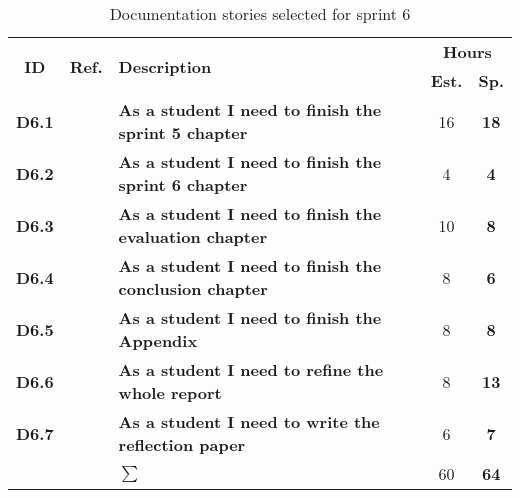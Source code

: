 \begin{table*}[!ht]%
 \def\arraystretch{1.25}
 
 \caption{Documentation stories selected for sprint 6}
   \label{tab:sprint6Documentationstories}

\begin{tabularx}{\textwidth}{ccXcc} 

\toprule[0.5mm]
\multirow{2}{*}{\textbf{ID}} &
\multirow{2}{*}{\textbf{Ref.}} & \multirow{2}{*}{\textbf{Description}} & \multicolumn{2}{c}{\textbf{Hours}} \\
 					& & & \textbf{Est.} & \textbf{Sp.} \\
\midrule

\textbf{D6.1} 	& & {\bf As a student I need to finish the sprint 5 chapter} 		& 16  & \textbf{18} \\
	
\textbf{D6.2} 	& & {\bf As a student I need to finish the sprint 6 chapter} 		& 4	& \textbf{4} \\

\textbf{D6.3} 	& & {\bf As a student I need to finish the evaluation chapter} 		& 10	& \textbf{8} \\

\textbf{D6.4} 	&& {\bf As a student I need to finish the conclusion chapter} 		& 8	& \textbf{6} \\

\textbf{D6.5} 	&& {\bf As a student I need to finish the Appendix} 				& 8	& \textbf{8} \\

\textbf{D6.6} 	&& {\bf As a student I need to refine the whole report} 			& 8	& \textbf{13} \\
\textbf{D6.7} 	&& {\bf As a student I need to write the reflection paper} 			& 6	& \textbf{7} \\
\midrule
		
				&& \textbf{$\sum$}		&	60	& \textbf{64}
 \\																			
\bottomrule[0.5mm]
\end{tabularx}
\end{table*}
